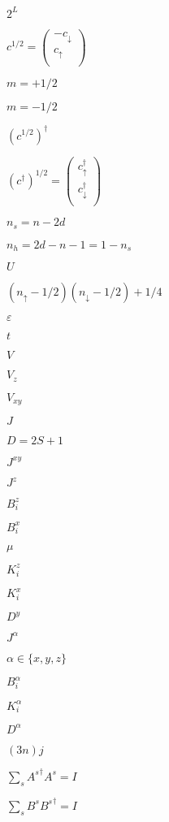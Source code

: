 \documentclass{article}
\begin{document}
$2^L$
\pagebreak

$c^{1/2} = \left( \begin{array}{c} -c_{\downarrow} \\ c_{\uparrow} \\ \end{array} \right)$
\pagebreak

$ m=+1/2$
\pagebreak

$ m=-1/2$
\pagebreak

$ \left(c^{1/2}\right)^\dagger$
\pagebreak

$\left(c^{\dagger}\right)^{1/2} = \left( \begin{array}{c} c^\dagger_{\uparrow} \\ c^\dagger_{\downarrow} \\ \end{array} \right)$
\pagebreak

$n_s=n-2d$
\pagebreak

$n_h=2d-n-1=1-n_s$
\pagebreak

$U$
\pagebreak

$(n_{\uparrow}-1/2)(n_{\downarrow}-1/2)+1/4$
\pagebreak

$\varepsilon$
\pagebreak

$t$
\pagebreak

$V$
\pagebreak

$V_z$
\pagebreak

$V_{xy}$
\pagebreak

$J$
\pagebreak

$D=2S+1$
\pagebreak

$J^{xy}$
\pagebreak

$J^{z}$
\pagebreak

$B^{z}_i$
\pagebreak

$B^{x}_i$
\pagebreak

$\mu$
\pagebreak

$K^{z}_i$
\pagebreak

$K^{x}_i$
\pagebreak

$D^{y}$
\pagebreak

$J^{\alpha}$
\pagebreak

$\alpha \in \{x,y,z\} $
\pagebreak

$B^{\alpha}_i$
\pagebreak

$K^{\alpha}_i$
\pagebreak

$D^{\alpha}$
\pagebreak

$(3n)j$
\pagebreak

$\sum_s {A^s}^\dag A^s=I$
\pagebreak

$\sum_s B^s {B^s}^\dag=I$
\pagebreak
\end{document}
